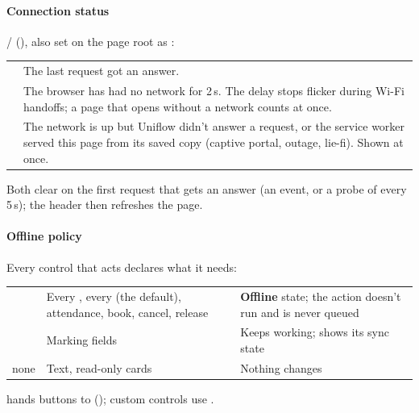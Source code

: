 \paragraph{Connection status}  / 
(), also set on the page root as
:
\begin{xltabular}{\linewidth}{@{}P{30mm} L@{}}
  \toprule
   & \\
  \midrule
   & The last request got an answer.\\
   & The browser has had no network for 2\,s. The delay stops flicker during Wi-Fi handoffs; a page that opens without a network counts at once.\\
   & The network is up but Uniflow didn't answer a request, or the service worker served this page from its saved copy (captive portal, outage, lie-fi). Shown at once.\\
  \bottomrule
\end{xltabular}
Both clear on the first request that gets an answer (an  event, or a probe of
 every 5\,s); the header then refreshes the page.

\paragraph{Offline policy} Every control that acts declares what it needs:
\begin{xltabular}{\linewidth}{@{}P{22mm} P{60mm} L@{}}
  \toprule
   &  & \\
  \midrule
   & Every , every  (the default), attendance, book, cancel, release & \textbf{Offline} state; the action doesn't run and is never queued\\
   & Marking fields & Keeps working; shows its sync state\\
  none & Text, read-only cards & Nothing changes\\
  \bottomrule
\end{xltabular}
 hands  buttons to 
(); custom controls use .

